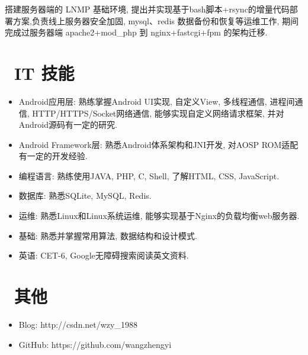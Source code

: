 \documentclass{resume}
\begin{document}
\begin{onehalfspacing}
搭建服务器端的 LNMP 基础环境, 提出并实现基于bash脚本+rsync的增量代码部署方案,负责线上服务器安全加固, mysql、redis 数据备份和恢复等运维工作, 期间完成过服务器端 apache2+mod\_php 到 nginx+fastcgi+fpm 的架构迁移.
\end{onehalfspacing}


\section{\faCogs\ IT 技能}
\begin{itemize}[parsep=0.5ex]
  \item Android应用层: 熟练掌握Android UI实现, 自定义View, 多线程通信, 进程间通信, HTTP/HTTPS/Socket网络通信, 能够实现自定义网络请求框架, 并对Android源码有一定的研究.
  \item Android Framework层: 熟悉Android体系架构和JNI开发, 对AOSP ROM适配有一定的开发经验.
  \item 编程语言: 熟练使用JAVA, PHP, C, Shell, 了解HTML, CSS, JavaScript.
  \item 数据库: 熟悉SQLite, MySQL, Redis.
  \item 运维: 熟悉Linux和Linux系统运维, 能够实现基于Nginx的负载均衡web服务器.
  \item 基础: 熟悉并掌握常用算法, 数据结构和设计模式.
  \item 英语: CET-6, Google无障碍搜索阅读英文资料.
\end{itemize}

\section{\faInfo\ 其他}
\begin{itemize}[parsep=0.5ex]
  \item Blog: http://csdn.net/wzy\_1988
  \item GitHub: https://github.com/wangzhengyi
\end{itemize}

%
%
\end{document}
